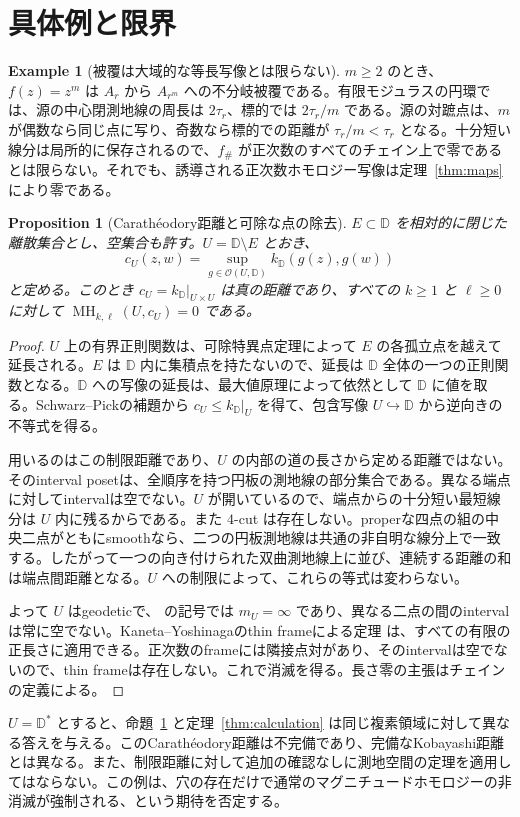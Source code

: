 \documentclass[12pt]{amsart}
\newtheorem{prop}[thm]{Proposition}
\theoremstyle{definition}
\newtheorem{eg}[thm]{Example}
\theoremstyle{remark}
\numberwithin{equation}{section}
\newcommand{\D}{\mathbb{D}}
\DeclareMathOperator{\MH}{MH}
\begin{document}
\section{具体例と限界}\label{sec:examples}
\begin{eg}[被覆は大域的な等長写像とは限らない]\label{eg:power}
$m\ge2$ のとき、$f(z)=z^m$ は $A_r$ から $A_{r^m}$ への不分岐被覆である。有限モジュラスの円環では、源の中心閉測地線の周長は $2\tau_r$、標的では $2\tau_r/m$ である。源の対蹠点は、$m$ が偶数なら同じ点に写り、奇数なら標的での距離が $\tau_r/m<\tau_r$ となる。十分短い線分は局所的に保存されるので、$f_\#$ が正次数のすべてのチェイン上で零であるとは限らない。それでも、誘導される正次数ホモロジー写像は定理~\ref{thm:maps} により零である。
\end{eg}

\begin{prop}[Carath\'eodory距離と可除な点の除去]\label{prop:caratheodory}
$E\subset\D$ を相対的に閉じた離散集合とし、空集合も許す。$U=\D\setminus E$ とおき、
\[
 c_U(z,w)=\sup_{g\in\mathcal O(U,\D)}k_{\D}(g(z),g(w))
\]
と定める。このとき $c_U=k_{\D}|_{U\times U}$ は真の距離であり、すべての $k\ge1$ と $\ell\ge0$ に対して $\MH_{k,\ell}(U,c_U)=0$ である。
\end{prop}
\begin{proof}
$U$ 上の有界正則関数は、可除特異点定理によって $E$ の各孤立点を越えて延長される。$E$ は $\D$ 内に集積点を持たないので、延長は $\D$ 全体の一つの正則関数となる。$\D$ への写像の延長は、最大値原理によって依然として $\D$ に値を取る。Schwarz--Pickの補題から $c_U\le k_{\D}|_U$ を得て、包含写像 $U\hookrightarrow\D$ から逆向きの不等式を得る。

用いるのはこの制限距離であり、$U$ の内部の道の長さから定める距離ではない。そのinterval posetは、全順序を持つ円板の測地線の部分集合である。異なる端点に対してintervalは空でない。$U$ が開いているので、端点からの十分短い最短線分は $U$ 内に残るからである。また $4$-cut は存在しない。properな四点の組の中央二点がともにsmoothなら、二つの円板測地線は共通の非自明な線分上で一致する。したがって一つの向き付けられた双曲測地線上に並び、連続する距離の和は端点間距離となる。$U$ への制限によって、これらの等式は変わらない。

よって $U$ はgeodeticで、\cite{KY} の記号では $m_U=\infty$ であり、異なる二点の間のintervalは常に空でない。Kaneta--Yoshinagaのthin frameによる定理 \cite[Theorem 5.2]{KY} は、すべての有限の正長さに適用できる。正次数のframeには隣接点対があり、そのintervalは空でないので、thin frameは存在しない。これで消滅を得る。長さ零の主張はチェインの定義による。
\end{proof}
$U=\D^*$ とすると、命題~\ref{prop:caratheodory} と定理~\ref{thm:calculation} は同じ複素領域に対して異なる答えを与える。このCarath\'eodory距離は不完備であり、完備なKobayashi距離とは異なる。また、制限距離に対して追加の確認なしに測地空間の定理を適用してはならない。この例は、穴の存在だけで通常のマグニチュードホモロジーの非消滅が強制される、という期待を否定する。
\end{document}
